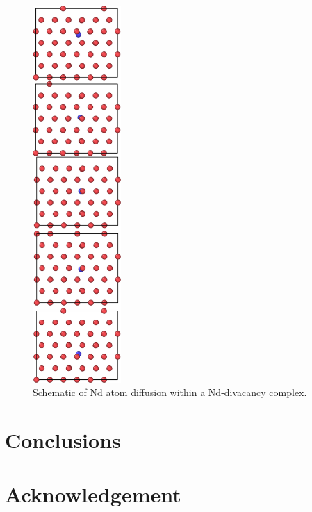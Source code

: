 \documentclass[review]{elsarticle}
\begin{document}
\begin{figure}[ht]
	\centering
	\includegraphics[width=0.3\textwidth]{nd_divac_mig.png}
    \caption{Schematic of Nd atom diffusion within a Nd-divacancy complex.}\label{fig:nd_divac_mig}
\end{figure}  


\FloatBarrier
\section{Conclusions}


\section{Acknowledgement}


\FloatBarrier


\end{document}
